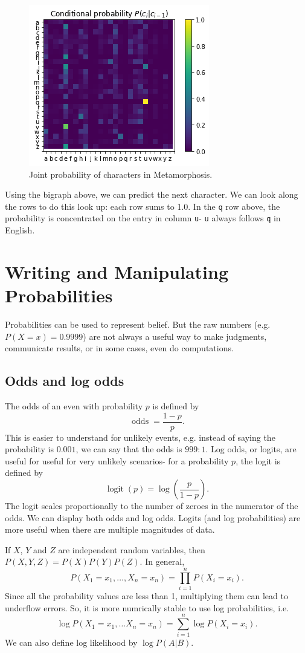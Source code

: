 \documentclass[a4paper, openany]{memoir}
\begin{document}
\begin{figure}[H]
    \centering
    \includegraphics[scale=0.6]{src/5.9 conditional probability.png}
    \caption{Joint probability of characters in Metamorphosis.}
\end{figure}
\noindent Using the bigraph above, we can predict the next character. We can look along the rows to do this look up: each row sums to 1.0. In the \texttt{q} row above, the probability is concentrated on the entry in column \texttt{u}- \texttt{u} always follows \texttt{q} in English.
\newpage

\section{Writing and Manipulating Probabilities}
Probabilities can be used to represent belief. But the raw numbers (e.g. $P(X = x) = 0.9999$) are not always a useful way to make judgments, communicate results, or in some cases, even do computations.

\subsection{Odds and log odds}
The odds of an even with probability $p$ is defined by
\[\operatorname{odds} = \frac{1 - p}{p}.\]
This is easier to understand for unlikely events, e.g. instead of saying the probability is $0.001$, we can say that the odds is $999:1$. Log odds, or logits, are useful for useful for very unlikely scenarios- for a probability $p$, the logit is defined by
\[\operatorname{logit}(p) = \log \left(\frac{p}{1-p}\right).\]
The logit scales proportionally to the number of zeroes in the numerator of the odds. We can display both odds and log odds. Logits (and log probabilities) are more useful when there are multiple magnitudes of data.

If $X$, $Y$ and $Z$ are independent random variables, then $P(X, Y, Z) = P(X) P(Y) P(Z)$. In general, 
\[P(X_1 = x_1, \dots, X_n = x_n) = \prod_{i=1}^n P(X_i = x_i).\]
Since all the probability values are less than 1, multiplying them can lead to underflow errors. So, it is more numrically stable to use log probabilities, i.e.
\[\log P(X_1 = x_1, \dots X_n = x_n) = \sum_{i=1}^n \log P(X_i = x_i).\]
We can also define log likelihood by $\log P(A|B)$. 
\end{document}
